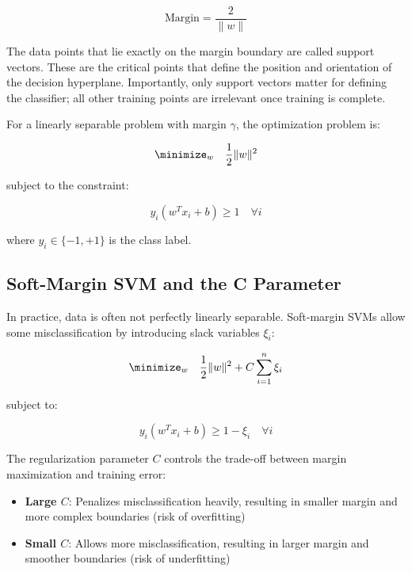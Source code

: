 \documentclass[12pt]{article}
\begin{document}
\begin{equation}
\text{Margin} = \frac{2}{\|w\|}
\end{equation}

The data points that lie exactly on the margin boundary are called support vectors. These are the critical points that define the position and orientation of the decision hyperplane. Importantly, only support vectors matter for defining the classifier; all other training points are irrelevant once training is complete.

For a linearly separable problem with margin $\gamma$, the optimization problem is:

\begin{equation}
\minimize_w \quad \frac{1}{2}\|w\|^2
\end{equation}

subject to the constraint:

\begin{equation}
y_i(w^T x_i + b) \geq 1 \quad \forall i
\end{equation}

where $y_i \in \{-1, +1\}$ is the class label.

\subsection{Soft-Margin SVM and the C Parameter}

In practice, data is often not perfectly linearly separable. Soft-margin SVMs allow some misclassification by introducing slack variables $\xi_i$:

\begin{equation}
\minimize_w \quad \frac{1}{2}\|w\|^2 + C \sum_{i=1}^{n} \xi_i
\end{equation}

subject to:

\begin{equation}
y_i(w^T x_i + b) \geq 1 - \xi_i \quad \forall i
\end{equation}

The regularization parameter $C$ controls the trade-off between margin maximization and training error:

\begin{itemize}
    \item \textbf{Large $C$}: Penalizes misclassification heavily, resulting in smaller margin and more complex boundaries (risk of overfitting)
    \item \textbf{Small $C$}: Allows more misclassification, resulting in larger margin and smoother boundaries (risk of underfitting)
\end{itemize}
\end{document}
